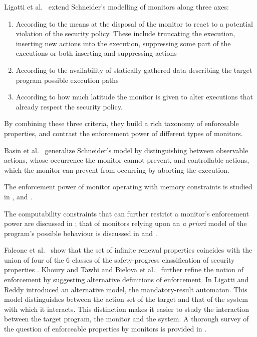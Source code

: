 \documentclass[12pt]{article}
\begin{document}
Ligatti et al.\ \cite{editauto} extend Schneider's modelling of monitors along three axes:
\begin{enumerate}
\item According to the means at the disposal of the monitor to react to a potential violation of the security policy. These include truncating the execution, inserting new actions into the execution, suppressing some part of the executions or both inserting and suppressing actions
\item According to the availability of statically gathered data describing the target program possible execution paths
\item According to how much latitude the monitor is given to alter executions that already respect the security policy.
\end{enumerate}
By combining these three criteria, they build a rich taxonomy of enforceable properties, and contrast the enforcement power of different types of monitors.

Basin et al.\ \cite{enforceableRevisited} generalize Schneider's model by distinguishing between observable actions, whose occurrence the monitor cannot prevent, and controllable actions, which the monitor can prevent from occurring by aborting the execution.

The enforcement power of monitor operating with memory constraints is studied in \cite{fong}, \cite{TTD06-a,TTD06-b,TTD08} and \cite{beauquier}.

The computability constraints that can further restrict a monitor's enforcement power are discussed in \cite{Computability2,CompuARM}; that of monitors relying upon an \textit{a priori} model of the program's possible behaviour is discussed in \cite{ChabotJournal} and \cite{editauto}.

Falcone et al.\ \cite{safProEnf1,safProEnf3} show that the set of infinite renewal properties coincides  with the union of four of the 6 classes of the safety-progress classification of security properties \cite{safPro}. Khoury and Tawbi \cite{KhouryEquiv,KT2012} and Bielova et al.\ \cite{BielovaNordsec,WhatMeanArt,DBLP:conf/essos/BielovaM11} further refine the notion of enforcement by suggesting alternative definitions of enforcement. In \cite{runtimeResults} Ligatti and Reddy introduced an alternative model, the mandatory-result automaton.  This model distinguishes between the action set of the target and that of the system with which it interacts. This distinction makes it easier to study the interaction between the target program, the monitor and the system. A thorough survey of the question of enforceable properties by monitors is provided in \cite{COSREVIEW12}.
\end{document}
